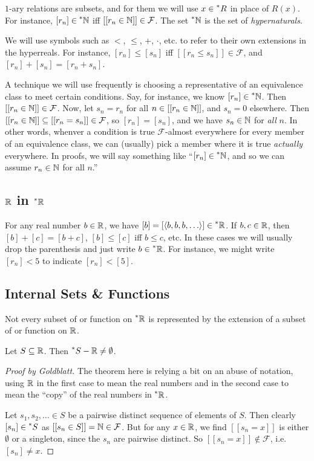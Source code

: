 $1$-ary relations are subsets, and for them we will use $x \in \prescript{*}{}{R}$ in place of $R(x)$. For instance, $[r_n] \in \prescript{*}{}{\mathbb{N}}$ iff $[[r_n \in \mathbb{N}]] \in \mathcal{F}$. The set $\prescript{*}{}{\mathbb{N}}$ is the set of \textit{hypernaturals}.

We will use symbols such as $<$, $\leq$, $+$, $\cdot$, etc. to refer to their own extensions in the hyperreals. For instance, $[r_n] \leq [s_n]$ iff $[[r_n \leq s_n]] \in \mathcal{F}$, and $[r_n] + [s_n] = [r_n + s_n]$.

A technique we will use frequently is choosing a representative of an equivalence class to meet certain conditions. Say, for instance, we know $[r_n] \in \prescript{*}{}{\mathbb{N}}$. Then $[[r_n \in \mathbb{N}]] \in \mathcal{F}$. Now, let $s_n = r_n$ for all $n \in [[r_n \in \mathbb{N}]]$, and $s_n = 0$ elsewhere. Then $[[r_n \in \mathbb{N}]] \subseteq [[r_n = s_n]] \in \mathcal{F}$, so $[r_n] = [s_n]$, and we have $s_n \in \mathbb{N}$ for \textit{all} $n$. In other words, whenver a condition is true $\mathcal{F}$-almost everywhere for every member of an equivalence class, we can (usually) pick a member where it is true \textit{actually} everywhere. In proofs, we will say something like ``$[r_n] \in \prescript{*}{}{\mathbb{N}}$, and so we can assume $r_n \in \mathbb{N}$ for all $n$.''

\subsection{\texorpdfstring{$\mathbb{R}$}{R} in \texorpdfstring{$\prescript{*}{}{\mathbb{R}}$}{*R}}
For any real number $b \in \mathbb{R}$, we have $[b] = [\langle b, b, b, \ldots \rangle] \in \prescript{*}{}{\mathbb{R}}$. If $b, c \in \mathbb{R}$, then $[b] + [c] = [b + c]$, $[b] \leq [c]$ iff $b \leq c$, etc. In these cases we will usually drop the parenthesis and just write $b \in \prescript{*}{}{\mathbb{R}}$. For instance, we might write $[r_n] < 5$ to indicate $[r_n] < [5]$.

\subsection{Internal Sets \& Functions}
Not every subset of or function on $\prescript{*}{}{\mathbb{R}}$ is represented by the extension of a subset of or function on $\mathbb{R}$.

\begin{thm}
    Let $S \subseteq \mathbb{R}$. Then $\prescript{*}{}{S} - \mathbb{R} \neq \emptyset$.
\end{thm}

\begin{proof}[Proof by Goldblatt]
    The theorem here is relying a bit on an abuse of notation, using $\mathbb{R}$ in the first case to mean the real numbers and in the second case to mean the ``copy'' of the real numbers in $\prescript{*}{}{\mathbb{R}}$.

    Let $s_1, s_2, \ldots \in S$ be a pairwise distinct sequence of elements of $S$. Then clearly $[s_n] \in \prescript{*}{}{S}$ as $[[s_n \in S]] = \mathbb{N} \in \mathcal{F}$. But for any $x \in \mathbb{R}$, we find $[[s_n = x]]$ is either $\emptyset$ or a singleton, since the $s_n$ are pairwise distinct. So $[[s_n = x]] \notin \mathcal{F}$, i.e. $[s_n] \neq x$.
\end{proof}


